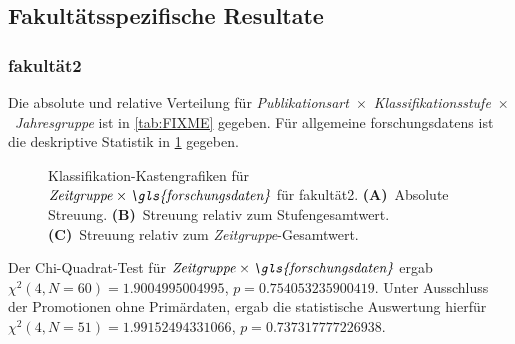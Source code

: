 \subsection{Fakultätsspezifische Resultate}\label{sec:luh-repo-results-specific}
\subsubsection{\gls{fakultät2}}
Die absolute und relative Verteilung für {\textit{Publikationsart}}~$\times$~{\textit{Klassifikationsstufe}}~$\times$~\textit{Jahresgruppe} ist in \cref{tab:FIXME} gegeben.
Für allgemeine \glspl{forschungsdaten} ist die deskriptive Statistik in \cref{fig:faculty_a_sampled_evaluated_adjusted_factors-only_Zeitgruppe_x_FD_absolute_boxplot} gegeben.
\begin{figure}[!htbp]
    \centering%
    \resizebox{.33\textwidth}{!}{}%
    \resizebox{.33\textwidth}{!}{}%
    \resizebox{.33\textwidth}{!}{}%
    \caption{Klassifikation-Kastengrafiken für $\text{\textit{Zeitgruppe}}\times\text{\textit{\gls{forschungsdaten}}}$ für \gls{fakultät2}. \textbf{(A)}~Absolute Streuung. \textbf{(B)}~Streuung relativ zum Stufengesamtwert. \textbf{(C)}~Streuung relativ zum \textit{Zeitgruppe}-Gesamtwert.}
    \label{fig:faculty_a_sampled_evaluated_adjusted_factors-only_Zeitgruppe_x_FD_absolute_boxplot}
\end{figure}
Der Chi-Quadrat-Test für $\text{\textit{Zeitgruppe}}\times\text{\textit{\gls{forschungsdaten}}}$ ergab $\chi^2 (\num{4}, N = \num{60}) = \num[round-mode=places,round-precision=3]{1.9004995004995}$, $p = \num[round-mode=places,round-precision=3]{0.754053235900419}$.
Unter Ausschluss der Promotionen ohne Primärdaten, ergab die statistische Auswertung hierfür $\chi^2 (\num{4}, N = \num{51}) = \num[round-mode=places,round-precision=3]{1.99152494331066}$, $p = \num[round-mode=places,round-precision=3]{0.737317777226938}$.

